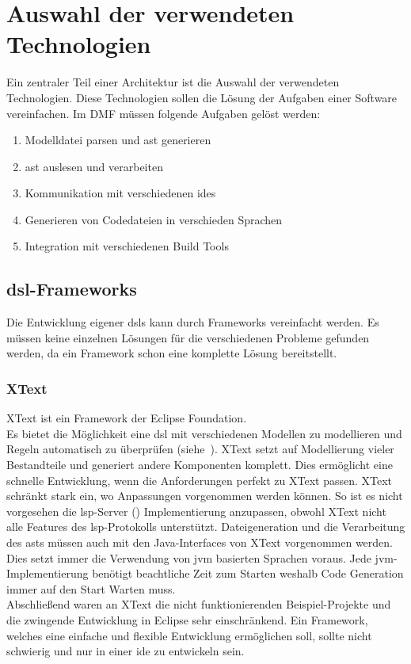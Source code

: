\documentclass[./einleitung.tex]{subfiles}
\begin{document}
\section{Auswahl der verwendeten Technologien}\label{sec:auswahl-der-verwendeten-technologien}
Ein zentraler Teil einer Architektur ist die Auswahl der verwendeten Technologien.
Diese Technologien sollen die Lösung der Aufgaben einer Software vereinfachen.
\newline
Im DMF müssen folgende Aufgaben gelöst werden:
\begin{enumerate}
\item Modelldatei parsen und \acrshort{ast} generieren
\item \acrshort{ast} auslesen und verarbeiten
\item Kommunikation mit verschiedenen \acrshort{ide}s
\item Generieren von Codedateien in verschieden Sprachen
\item Integration mit verschiedenen Build Tools
\end{enumerate}

\subsection{\acrshort{dsl}-Frameworks}\label{subsec:dsl-frameworks}
Die Entwicklung eigener \acrshort{dsl}s kann durch Frameworks vereinfacht werden.
Es müssen keine einzelnen Lösungen für die verschiedenen Probleme gefunden werden, da ein Framework schon eine komplette Lösung bereitstellt.
\subsubsection{XText}
XText ist ein Framework der Eclipse Foundation.\\
Es bietet die Möglichkeit eine \acrfull{dsl} mit verschiedenen Modellen zu modellieren und Regeln automatisch zu überprüfen (siehe~\cite{xtextWebsite}).
XText setzt auf Modellierung vieler Bestandteile und generiert andere Komponenten komplett.
Dies ermöglicht eine schnelle Entwicklung, wenn die Anforderungen perfekt zu XText passen.
XText schränkt stark ein, wo Anpassungen vorgenommen werden können.
So ist es nicht vorgesehen die \acrshort{lsp}-Server () Implementierung anzupassen, obwohl XText nicht alle Features des \acrlong{lsp}-Protokolls unterstützt.
Dateigeneration und die Verarbeitung des \acrshort{ast}s müssen auch mit den Java-Interfaces von XText vorgenommen werden.
Dies setzt immer die Verwendung von \acrshort{jvm} basierten Sprachen voraus.
Jede \acrshort{jvm}-Implementierung benötigt beachtliche Zeit zum Starten weshalb Code Generation immer auf den Start Warten muss. \\
Abschließend waren an XText die nicht funktionierenden Beispiel-Projekte und die zwingende Entwicklung in Eclipse sehr einschränkend.
Ein Framework, welches eine einfache und flexible Entwicklung ermöglichen soll, sollte nicht schwierig und nur in einer \acrshort{ide} zu entwickeln sein.
\end{document}
